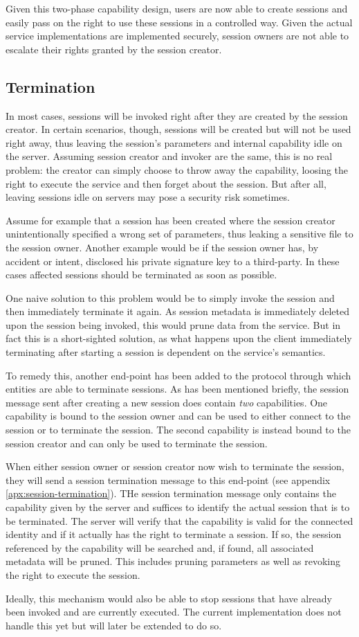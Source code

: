Given this two-phase capability design, users are now able to create sessions and easily pass on the right to use these sessions in a controlled way.
Given the actual service implementations are implemented securely, session owners are not able to escalate their rights granted by the session creator.

\subsection{Termination}

In most cases, sessions will be invoked right after they are created by the session creator.
In certain scenarios, though, sessions will be created but will not be used right away, thus leaving the session's parameters and internal capability idle on the server.
Assuming session creator and invoker are the same, this is no real problem: the creator can simply choose to throw away the capability, loosing the right to execute the service and then forget about the session.
But after all, leaving sessions idle on servers may pose a security risk sometimes.

Assume for example that a session has been created where the session creator unintentionally specified a wrong set of parameters, thus leaking a sensitive file to the session owner.
Another example would be if the session owner has, by accident or intent, disclosed his private signature key to a third-party.
In these cases affected sessions should be terminated as soon as possible.

One naive solution to this problem would be to simply invoke the session and then immediately terminate it again.
As session metadata is immediately deleted upon the session being invoked, this would prune data from the service.
But in fact this is a short-sighted solution, as what happens upon the client immediately terminating after starting a session is dependent on the service's semantics.

To remedy this, another end-point has been added to the protocol through which entities are able to terminate sessions.
As has been mentioned briefly, the session message sent after creating a new session does contain \emph{two} capabilities.
One capability is bound to the session owner and can be used to either connect to the session or to terminate the session.
The second capability is instead bound to the session creator and can only be used to terminate the session.

When either session owner or session creator now wish to terminate the session, they will send a session termination message to this end-point (see appendix \ref{apx:session-termination}).
THe session termination message only contains the capability given by the server and suffices to identify the actual session that is to be terminated.
The server will verify that the capability is valid for the connected identity and if it actually has the right to terminate a session.
If so, the session referenced by the capability will be searched and, if found, all associated metadata will be pruned.
This includes pruning parameters as well as revoking the right to execute the session.

Ideally, this mechanism would also be able to stop sessions that have already been invoked and are currently executed.
The current implementation does not handle this yet but will later be extended to do so.

